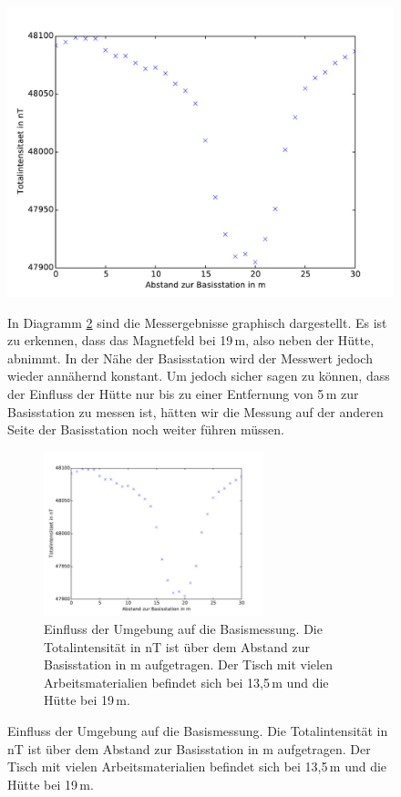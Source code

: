 \begin{figure}[!ht]
 \centering
 \includegraphics[width=\textwidth]{fig/plot_huette.pdf}

In Diagramm \ref{fig:plot_huette} sind die Messergebnisse graphisch dargestellt. Es ist zu erkennen, dass das Magnetfeld bei 19\,m, also neben der Hütte, abnimmt. In der Nähe der Basisstation wird der Messwert jedoch wieder annähernd konstant. Um jedoch sicher sagen zu können, dass der Einfluss der Hütte nur bis zu einer Entfernung von 5\,m zur Basisstation zu messen ist, hätten wir die Messung auf der anderen Seite der Basisstation noch weiter führen müssen.

\begin{figure}[!ht]
 \centering
 \includegraphics[width=0.7\textwidth]{fig/plot_huette.pdf}

 \caption[Einfluss der Umgebung auf die Basismessung]{Einfluss der Umgebung auf die Basismessung. Die Totalintensität in nT ist über dem Abstand zur Basisstation in m aufgetragen. Der Tisch mit vielen Arbeitsmaterialien befindet sich bei 13,5\,m und die Hütte bei 19\,m.}
 \label{fig:plot_huette}
\end{figure}



\end{figure}
